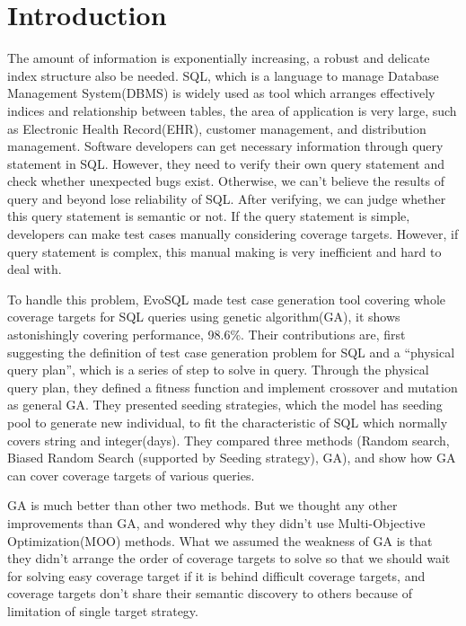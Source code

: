 \chapter{Introduction}

The amount of information is exponentially increasing, a robust and delicate index structure also be needed. SQL, which is a language to manage Database Management System(DBMS) is widely used as tool which arranges effectively indices and relationship between tables, the area of application is very large, such as Electronic Health Record(EHR), customer management, and distribution management. Software developers can get necessary information through query statement in SQL. However, they need to verify their own query statement and check whether unexpected bugs exist. Otherwise, we can't believe the results of query and beyond lose reliability of SQL. After verifying, we can judge whether this query statement is semantic or not. If the query statement is simple, developers can make test cases manually considering coverage targets. However, if query statement is complex, this manual making is very inefficient and hard to deal with.

To handle this problem, EvoSQL\cite{castelein2018search} made test case generation tool covering whole coverage targets for SQL queries using genetic algorithm(GA), it shows astonishingly covering performance, 98.6\%. Their contributions are, first suggesting the definition of test case generation problem for SQL and a ``physical query plan'', which is a series of step to solve in query. Through the physical query plan, they defined a fitness function and implement crossover and mutation as general GA. They presented seeding strategies, which the model has seeding pool to generate new individual, to fit the characteristic of SQL which normally covers string and integer(days). They compared three methods (Random search, Biased Random Search (supported by Seeding strategy), GA), and show how GA can cover coverage targets of various queries.
 

GA is much better than other two methods. But we thought any other improvements than GA, and wondered why they didn't use Multi-Objective Optimization(MOO)\cite{panichella2015reformulating} methods. What we assumed the weakness of GA is that they didn't arrange the order of coverage targets to solve so that we should wait for solving easy coverage target if it is behind difficult coverage targets, and coverage targets don't share their semantic discovery to others because of limitation of single target strategy.
 

